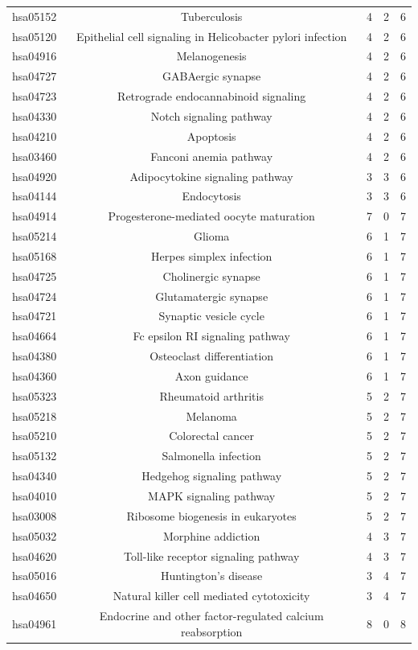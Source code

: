 \begin{center}
\begin{longtable}{@{}ccccc@{}}
hsa05152	&Tuberculosis&	4&	2&	6\\
hsa05120	&Epithelial cell signaling in Helicobacter pylori infection&	4&	2&	6\\
hsa04916	&Melanogenesis&	4&	2&	6\\
hsa04727	&GABAergic synapse&	4&	2&	6\\
hsa04723	&Retrograde endocannabinoid signaling&	4&	2&	6\\
hsa04330	&Notch signaling pathway&	4&	2&	6\\
hsa04210	&Apoptosis&	4&	2&	6\\
hsa03460	&Fanconi anemia pathway&	4&	2&	6\\
hsa04920	&Adipocytokine signaling pathway&	3&	3&	6\\
hsa04144	&Endocytosis&	3&	3&	6\\
hsa04914	&Progesterone-mediated oocyte maturation&	7&	0&	7\\
hsa05214	&Glioma&	6&	1&	7\\
hsa05168	&Herpes simplex infection&	6&	1&	7\\
hsa04725	&Cholinergic synapse&	6&	1&	7\\
hsa04724	&Glutamatergic synapse&	6&	1&	7\\
hsa04721	&Synaptic vesicle cycle&	6&	1&	7\\
hsa04664	&Fc epsilon RI signaling pathway&	6&	1&	7\\
hsa04380	&Osteoclast differentiation&	6&	1&	7\\
hsa04360	&Axon guidance&	6&	1&	7\\
hsa05323	&Rheumatoid arthritis&	5&	2&	7\\
hsa05218	&Melanoma&	5&	2&	7\\
hsa05210	&Colorectal cancer&	5&	2&	7\\
hsa05132	&Salmonella infection&	5&	2&	7\\
hsa04340	&Hedgehog signaling pathway&	5&	2&	7\\
hsa04010	&MAPK signaling pathway&	5&	2&	7\\
hsa03008	&Ribosome biogenesis in eukaryotes&	5&	2&	7\\
hsa05032	&Morphine addiction&	4&	3&	7\\
hsa04620	&Toll-like receptor signaling pathway&	4&	3&	7\\
hsa05016	&Huntington's disease&	3&	4&	7\\
hsa04650	&Natural killer cell mediated cytotoxicity&	3&	4&	7\\
hsa04961	&Endocrine and other factor-regulated calcium reabsorption&	8&	0&	8\\

\end{longtable}
\end{center}
